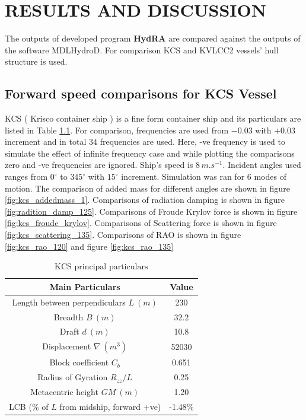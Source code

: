 \chapter{RESULTS AND DISCUSSION}
The outputs of developed program {\bf HydRA} are compared against the outputs of the
software MDLHydroD. For comparison KCS and KVLCC2 vessels' hull structure is used. 

\section{Forward speed comparisons for KCS Vessel}
KCS ( Krisco container ship ) is a fine form container ship and its particulars are listed in Table 
\ref{tab:kcs_principal_particulars}. 
For comparison, frequencies are used from
$-0.03$ with $+0.03$ increment and in total $34$ frequencies are used. Here, -ve frequency is 
used to simulate the effect of infinite frequency case and while plotting the comparisons
zero and -ve frequencies are ignored.
Ship's speed is $8\,\si{m.s^{-1}}$. 
Incident angles used 
ranges from $0^{\circ}$ to $345^{\circ}$ with $15^{\circ}$ increment. Simulation was ran for 6 modes of motion.  
The comparison of added mass for different angles are shown in figure \ref{fig:kcs_addedmass_1}.
Comparisons of radiation damping is shown in figure \ref{fig:radition_damp_125}. 
Comparisons of Froude Krylov force is shown in figure \ref{fig:kcs_froude_krylov}.
Comparisons of Scattering force is shown in figure \ref{fig:kcs_scattering_135}. 
Comparisons of RAO is shown in figure \ref{fig:kcs_rao_120}
and figure \ref{fig:kcs_rao_135}

\begin{table}[h]
    \centering
    \setlength{\tabcolsep}{10pt} %
    \renewcommand{\arraystretch}{1.17} %
    \caption{$\text{KCS principal particulars}$}
    \begin{tabular}{|c|c|}
        \hline
        {\bf Main Particulars} & {\bf Value} \\
        \hline 
        Length between perpendiculars $L ~(m)$ & 230 \\ 
        Breadth $B ~(m)$ & 32.2  \\
        Draft $d ~(m)$ & 10.8  \\
        Displacement $\nabla ~(m^{3})$ & 52030  \\
        Block coefficient $C_{b}$ & 0.651   \\
        Radius of Gyration $R_{zz}/L$ & 0.25 \\
        Metacentric height $GM ~(m)$ & 1.20 \\
        LCB (\% of $L$ from midship, forward +ve) & -1.48\% \\
        \hline
    \end{tabular}
    \label{tab:kcs_principal_particulars}
\end{table}


